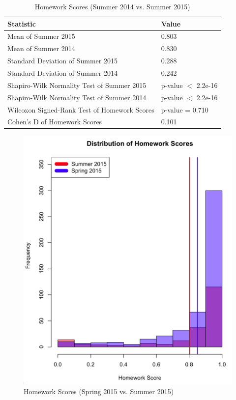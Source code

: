 \pagebreak\clearpage

\begin{small}
\begin{table}
  \centering
  \begin{tabular}{|l|l|}
    \hline
    \textbf{Statistic} & \textbf{Value} \\
	\hline
	Mean of Summer 2015 & 0.803 \\
	\hline
	Mean of Summer 2014 & 0.830 \\
	\hline
	Standard Deviation of Summer 2015 & 0.288 \\
	\hline
	Standard Deviation of Summer 2014 & 0.242 \\
	\hline
	Shapiro-Wilk Normality Test of Summer 2015 & p-value $<$ 2.2e-16 \\
	\hline
	Shapiro-Wilk Normality Test of Summer 2014 & p-value $<$ 2.2e-16 \\
	\hline
	Wilcoxon Signed-Rank Test of Homework Scores & p-value = 0.710 \\
	\hline
	Cohen's D of Homework Scores & 0.101 \\
	\hline
  \end{tabular}
	\caption[Homework Scores (Summer 2014 vs. Summer 2015)]{Homework Scores (Summer 2014 vs. Summer 2015)}
  \label{tab:hwSu14Su15}
\end{table}
\end{small}

\pagebreak\clearpage

\begin{figure}
	\centering
	\includegraphics[width=5in]{img/chapter4/hw_su15_vs_sp15}
	\caption{Homework Scores (Spring 2015 vs. Summer 2015)}
  \label{fig:hwSp15Su15}
\end{figure}

